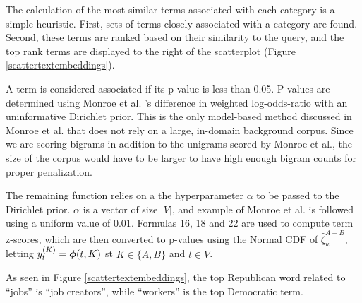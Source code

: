 \documentclass[11pt,a4paper]{article}
\begin{document}
The calculation of the most similar terms associated with each category is a simple heuristic.  First, sets of terms closely associated with a category are found. Second, these terms are ranked based on their similarity to the query, and the top rank terms are displayed to the right of the scatterplot (Figure \ref{scattertextembeddings}).  

A term is considered associated if its p-value is less than 0.05.  P-values are determined using Monroe et al. 's difference in weighted log-odds-ratio with an uninformative Dirichlet prior.  This is the only model-based method discussed in Monroe et al. that does not rely on a large, in-domain background corpus. Since we are scoring bigrams in addition to the unigrams scored by Monroe et al., the size of the corpus would have to be larger to have high enough bigram counts for proper penalization.

The remaining function relies on a the hyperparameter \mbox{\boldmath$\alpha$} to be passed to the Dirichlet prior.  \mbox{\boldmath$\alpha$} is a vector of size $|V|$, and example of Monroe et al. is followed using a uniform value of $0.01$.  Formulas 16, 18 and 22 are used to compute term z-scores, which are then converted to p-values using the Normal CDF of $\hat{\zeta}_{w}^{A-B}$, letting $y^{(K)}_{t} = \mbox{\boldmath$\phi$}(t,K)$ st ${K}\in{\{A,B\}}$ and $t\in{V}$.

As seen in Figure \ref{scattertextembeddings}, the top Republican word related to ``jobs'' is ``job creators'', while ``workers'' is the top Democratic term.
\vspace{-.5cm}


\end{document}
